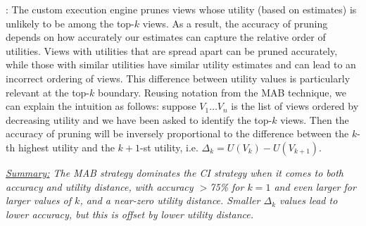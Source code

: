  :
 The custom execution engine prunes views whose utility (based on estimates) 
 is unlikely to be among the top-$k$ views.
 As a result, the accuracy of pruning depends on how accurately
 our estimates can capture the relative order of utilities.
 Views with utilities that are spread apart can be pruned accurately, while
 those with similar utilities have similar utility estimates and can 
 lead to an incorrect ordering of views.
 This difference between utility values is particularly relevant at the top-$k$
 boundary.
 Reusing notation from the MAB technique, we can explain the intuition as follows: 
 suppose $V_1 \ldots V_n$ is the list of views ordered by decreasing 
 utility and we have been asked to identify the top-$k$ views.
 Then the accuracy of pruning will be inversely proportional to the difference between
 the $k$-th highest utility and the $k+1$-st utility, i.e. $\Delta_k = U(V_k) - U(V_{k+1})$.
 

{\em \underline{Summary:} The MAB strategy dominates the CI
strategy when it comes to both accuracy and utility distance,
with accuracy $>$75\%  for $k = 1$ and even larger for larger
values of $k$, and a near-zero utility distance. 
Smaller $\Delta_k$ values lead to lower accuracy, but this is offset by
lower utility distance.
 }

